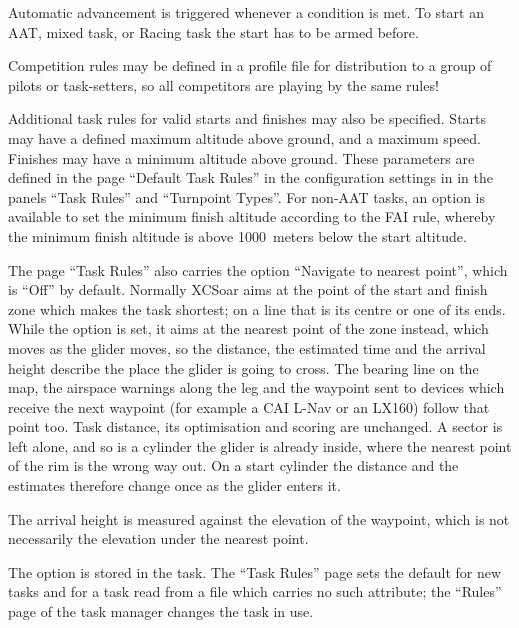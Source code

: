 Automatic advancement is triggered whenever a condition is met. To start an AAT,
mixed task, or Racing task the start has to be armed before.

\tip{} Competition rules may be defined in a profile file for
distribution to a group of pilots or task-setters, so all competitors
are playing by the same rules!

Additional task rules for valid starts and finishes may also be
specified.  Starts may have a defined maximum altitude above ground,
and a maximum speed.  Finishes may have a minimum altitude above
ground.  These parameters are defined in the page ``Default Task Rules'' in
the configuration  settings in
\blink{} in the panels ``Task Rules'' and ``Turnpoint Types''.
For non-AAT tasks, an option is available to set the minimum finish
altitude according to the FAI rule, whereby the minimum finish
altitude is above 1000~meters below the start altitude.

The page ``Task Rules'' also carries the option ``Navigate to nearest
point'', which is ``Off'' by default.  Normally XCSoar aims at the
point of the start and finish zone which makes the task shortest; on a
line that is its centre or one of its ends.  While the option is set,
it aims at the nearest point of the zone instead, which moves as the
glider moves, so the distance, the estimated time and the arrival
height describe the place the glider is going to cross.  The bearing
line on the map, the airspace warnings along the leg and the waypoint
sent to devices which receive the next waypoint (for example a CAI
L-Nav or an LX160) follow that point too.  Task distance, its
optimisation and scoring are unchanged.  A sector is left alone, and so is a cylinder the glider is
already inside, where the nearest point of the rim is the wrong way
out.  On a start cylinder the distance and the estimates therefore
change once as the glider enters it.

The arrival height is measured against the elevation of the waypoint,
which is not necessarily the elevation under the nearest point.

The option is stored in the task.  The ``Task Rules'' page sets the
default for new tasks and for a task read from a file which carries no
such attribute; the ``Rules'' page of the task manager changes the task
in use.


